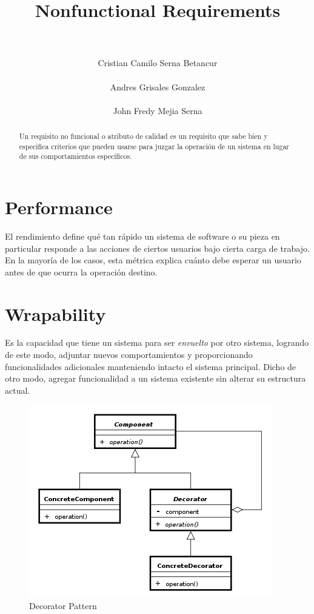 \documentclass[a4paper,11pt]{article}
\title{\LARGE \bf 
    Nonfunctional Requirements
}
\author{\\\\ Cristian Camilo Serna Betancur \\\\ Andres Grisales Gonzalez  
\\\\ John Fredy Mejia Serna}
\begin{document}
\maketitle
\tableofcontents
\begin{abstract}
    Un requisito no funcional o atributo de calidad es un requisito que sabe 
    bien y especifica criterios que pueden usarse para juzgar la operación de 
    un sistema en lugar de sus comportamientos específicos.\cite{DEFINITION}
\end{abstract}

\section{Performance}
El rendimiento define qué tan rápido un sistema de software o su pieza en 
particular responde a las acciones de ciertos usuarios bajo cierta carga de 
trabajo. En la mayoría de los casos, esta métrica explica cuánto debe esperar 
un usuario antes de que ocurra la operación destino.

\section{Wrapability}
Es la capacidad que tiene un sistema para ser \emph{envuelto} por otro sistema, 
logrando de este modo, adjuntar nuevos comportamientos y proporcionando 
funcionalidades adicionales manteniendo intacto el sistema principal. Dicho de 
otro modo, agregar funcionalidad a un sistema existente sin alterar su 
estructura actual.

\begin{figure}[!h]
    \centering
    \includegraphics[scale=.7]{assets/decorator.png}
    \caption{Decorator Pattern}
\end{figure}
\end{document}
